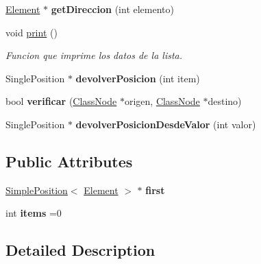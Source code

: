 \begin{DoxyCompactItemize}
\hyperlink{class_element}{Element} $\ast$ {\bfseries get\+Direccion} (int elemento)
\item 
\mbox{\label{class_single_linked_list_a64d9f3e1bad3eec787d2bcc7255c1311}} 
void \hyperlink{class_single_linked_list_a64d9f3e1bad3eec787d2bcc7255c1311}{print} ()
\begin{DoxyCompactList}\small\item\em Funcion que imprime los datos de la lista. \end{DoxyCompactList}\item 
\mbox{\label{class_single_linked_list_a09b8d66c2be112326210373514f32cd7}} 
Single\+Position $\ast$ {\bfseries devolver\+Posicion} (int item)
\item 
\mbox{\label{class_single_linked_list_aebc417269f785f2f8d3689403e7a6524}} 
bool {\bfseries verificar} (\hyperlink{class_class_node}{Class\+Node} $\ast$origen, \hyperlink{class_class_node}{Class\+Node} $\ast$destino)
\item 
\mbox{\label{class_single_linked_list_a2ed18090fd23eba38a668e40e0bca2c4}} 
Single\+Position $\ast$ {\bfseries devolver\+Posicion\+Desde\+Valor} (int valor)
\end{DoxyCompactItemize}
\subsection*{Public Attributes}
\begin{DoxyCompactItemize}
\item 
\mbox{\label{class_single_linked_list_a870bf08579b5a9cb4d570b57cbcdc826}} 
\hyperlink{class_simple_position}{Simple\+Position}$<$ \hyperlink{class_element}{Element} $>$ $\ast$ {\bfseries first}
\item 
\mbox{\label{class_single_linked_list_a8449fa747af940f9d1c9c6e8758539b8}} 
int {\bfseries items} =0
\end{DoxyCompactItemize}


\subsection{Detailed Description}
